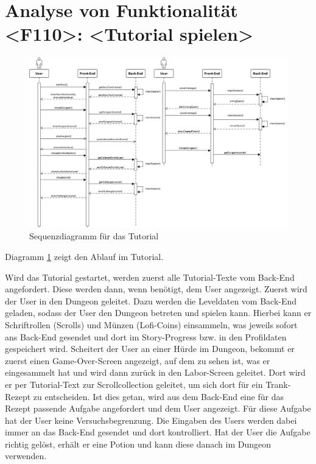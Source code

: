 \section{Analyse von Funktionalität <F110>: <Tutorial spielen>}
\begin{figure}[h]
\centering
\includegraphics[width=1.0\textwidth]{figures/sequenz_F110.pdf}
\caption{Sequenzdiagramm für das Tutorial}
\label{sequence_f110}
\end{figure}
Diagramm \ref{sequence_f110} zeigt den Ablauf im Tutorial.

Wird das Tutorial gestartet, werden zuerst alle Tutorial-Texte vom Back-End angefordert. Diese werden dann, wenn benötigt, dem User angezeigt. Zuerst wird der User in den Dungeon geleitet. Dazu werden die Leveldaten vom Back-End geladen, sodass der User den Dungeon betreten und spielen kann. Hierbei kann er Schriftrollen (\glqq Scrolls\grqq) und Münzen (\glqq Lofi-Coins\grqq) einsammeln, was jeweils sofort ans Back-End gesendet und dort im Story-Progress bzw. in den Profildaten gespeichert wird.
Scheitert der User an einer Hürde im Dungeon, bekommt er zuerst einen Game-Over-Screen angezeigt, auf dem zu sehen ist, was er eingesammelt hat und wird dann zur\"uck in den Labor-Screen geleitet.
Dort wird er per Tutorial-Text zur Scrollcollection geleitet, um sich dort für ein Trank-Rezept zu entscheiden. Ist dies getan, wird aus dem Back-End eine für das Rezept passende Aufgabe angefordert und dem User angezeigt. Für diese Aufgabe hat der User keine Versuchsbegrenzung. Die Eingaben des Users werden dabei immer an das Back-End gesendet und dort kontrolliert. Hat der User die Aufgabe richtig gelöst, erhält er eine Potion und kann diese danach im Dungeon verwenden.

